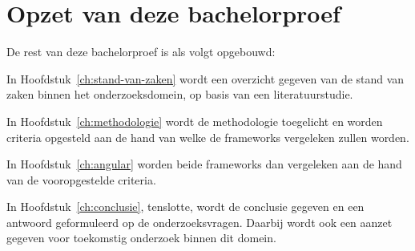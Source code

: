 \section{Opzet van deze bachelorproef}
\label{sec:opzet-bachelorproef}


De rest van deze bachelorproef is als volgt opgebouwd:

In Hoofdstuk~\ref{ch:stand-van-zaken} wordt een overzicht gegeven van de stand van zaken binnen het onderzoeksdomein, op basis van een literatuurstudie.

In Hoofdstuk~\ref{ch:methodologie} wordt de methodologie toegelicht en worden criteria opgesteld aan de hand van welke de frameworks vergeleken zullen worden.

In Hoofdstuk~\ref{ch:angular} worden beide frameworks dan vergeleken aan de hand van de vooropgestelde criteria.


In Hoofdstuk~\ref{ch:conclusie}, tenslotte, wordt de conclusie gegeven en een antwoord geformuleerd op de onderzoeksvragen. Daarbij wordt ook een aanzet gegeven voor toekomstig onderzoek binnen dit domein.

